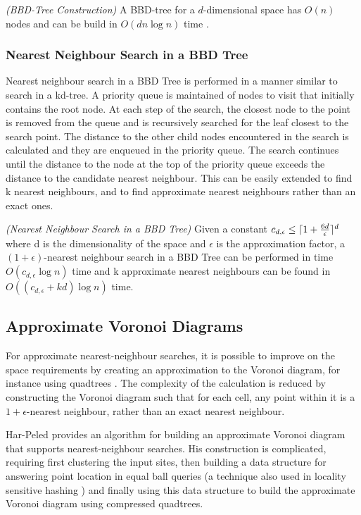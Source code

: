 \documentclass[mcs]{scsthesis}
\begin{document}
\begin{thm} \emph{(BBD-Tree Construction)} 
A BBD-tree for a \(d\)-dimensional space has \(O(n)\) nodes and can be build in
\(O(d n \log n)\) time \cite{optimalann}.
\end{thm}

\subsubsection{Nearest Neighbour Search in a BBD Tree}

Nearest neighbour search in a BBD Tree is performed in a manner similar to
search in a kd-tree. A priority queue is maintained of nodes to visit that 
initially contains the root node. At each step of the search, the closest
node to the point is removed from the queue and is recursively searched for
the leaf closest to the search point. The distance to the other child nodes
encountered in the search is calculated and they are enqueued in the priority
queue. The search continues until the distance to the node at the top of the
priority queue exceeds the distance to the candidate nearest neighbour. This
can be easily extended to find k nearest neighbours, and to find approximate
nearest neighbours rather than an exact ones.

\begin{thm} \emph{(Nearest Neighbour Search in a BBD Tree)} 
Given a constant \(c_{d,\epsilon} \le \lceil 1 + {6d \over \epsilon} \rceil^d\)
where d is the dimensionality of the space and \(\epsilon\) is the approximation
factor, a \((1 + \epsilon)\)-nearest neighbour search in a BBD Tree can be
performed in time \(O(c_{d,\epsilon} \log n)\) time and k approximate nearest
neighbours can be found in \(O((c_{d,\epsilon} + kd) \log n)\) time.
\end{thm}

\subsection{Approximate Voronoi Diagrams}

For approximate nearest-neighbour searches, it is possible to improve on the
space requirements by creating an approximation to the Voronoi diagram, for
instance using quadtrees \cite{avd}. The complexity of the calculation is
reduced by constructing the Voronoi diagram such that for each cell, any point
within it is a \(1 + \epsilon\)-nearest neighbour, rather than an exact
nearest neighbour.

Har-Peled \cite{avd} provides an algorithm for building an approximate
Voronoi diagram that supports nearest-neighbour searches. His construction is
complicated, requiring first clustering the input sites, then
building a data structure for answering point location in equal ball queries
(a technique also used in locality sensitive hashing \cite{lsh}) and finally
using this data structure to build the approximate Voronoi diagram using
compressed quadtrees.
\end{document}

